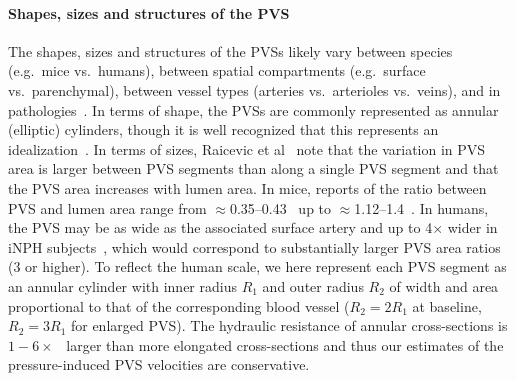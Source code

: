 \documentclass[fleqn,10pt]{wlscirep}
\begin{document}
\paragraph{Shapes, sizes and structures of the PVS}
The shapes, sizes and structures of the PVSs likely vary between
species (e.g.~mice vs.~humans), between spatial compartments
(e.g.~surface vs.~parenchymal), between vessel types (arteries
vs.~arterioles vs.~veins), and in
pathologies~\cite{ichimura1991distribution, foley2012realtime,
  schain2017cortical, mestre2018flow, bedussi2018paravascular,
  mestre2022periarteriolar, smets2024perivascular, raicevic2023sizes,
  vinje2021brain, eide2024functional}. In terms of shape, the PVSs are
commonly represented as annular (elliptic) cylinders, though it is
well recognized that this represents an
idealization~\cite{mestre2018flow, tithof2019hydraulic,
  vinje2021brain, raicevic2023sizes, boster2024hydraulic,
  smets2024perivascular}. In terms of sizes, Raicevic et
al~\cite{raicevic2023sizes} note that the variation in PVS area is
larger between PVS segments than along a single PVS segment and that
the PVS area increases with lumen area. In mice, reports of the ratio
between PVS and lumen area range from
$\approx$0.35--0.43~\cite{smets2024perivascular} up to
$\approx$1.12--1.4~\cite{raicevic2023sizes, mestre2018flow}. In
humans, the PVS may be as wide as the associated surface artery and up
to 4$\times$ wider in iNPH subjects~\cite{eide2024functional}, which
would correspond to substantially larger PVS area ratios (3 or
higher). To reflect the human scale, we here represent each PVS
segment as an annular cylinder with inner radius $R_1$ and outer
radius $R_2$ of width and area proportional to that of the
corresponding blood vessel ($R_2 = 2 R_1$ at baseline, $R_2 = 3 R_1$
for enlarged PVS). The hydraulic resistance of annular cross-sections
is $1-6 \times$~\cite{tithof2019hydraulic} larger than more elongated
cross-sections and thus our estimates of the pressure-induced PVS
velocities are conservative.




\end{document}
